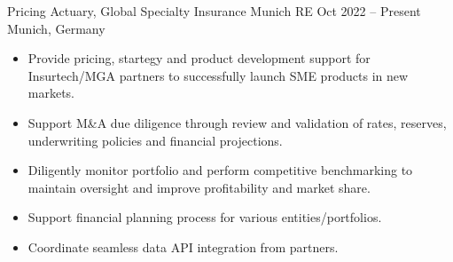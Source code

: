\documentclass[a4paper,]{fortysecondscv}
\begin{document}
\begin{cvtable}%


    \vspace{\topsep}
    \cvitemoneblock
    {Pricing Actuary, Global Specialty Insurance}
    {Munich RE}
    {Oct 2022 -- Present}
    {Munich, Germany}
    {
        \begin{itemize}[nosep, leftmargin=12pt, label={-}] %
            \item Provide pricing, startegy and product development support for Insurtech\//MGA partners to successfully launch SME products in new markets.
            \item Support M\&A due diligence through review and validation of rates, reserves, underwriting policies and financial projections.
            \item Diligently monitor portfolio and perform competitive benchmarking to maintain oversight and improve profitability and market share.
            \item Support financial planning process for various entities/portfolios.
            \item Coordinate seamless data API integration from partners.
        \end{itemize}
    }


\end{cvtable}
\end{document}
